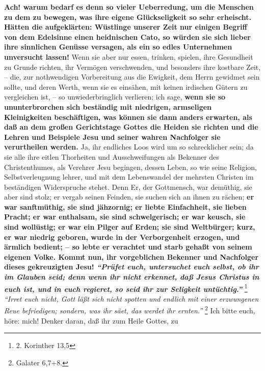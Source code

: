 \medskip

\textbf{Ach! warum bedarf es denn so vieler Ueberredung, um die Menschen zu dem
zu
bewegen, was ihre eigene Glückseligkeit so sehr erheischt. Hätten die
aufgeklärten: Wüstlinge unserer Zeit nur einigen Begriff von dem Edelsinne einen
heidnischen Cato, so würden sie sich lieber ihre
sinnlichen Genüsse
versagen, als ein so edles Unternehmen unversucht lassen!} Wenn sie aber nur
essen, trinken, spielen, ihre Gesundheit zu Grunde richten, ihr Vermögen
verschwenden, und besonders ihre kostbare Zeit, -- die, zur nothwendigen
Vorbereitung aus die Ewigkeit, dem Herrn gewidmet sein sollte, und deren Werth,
wenn sie es einsähen, mit keinen irdischen Gütern zu vergleichen ist, -- so
unwiederbringlich verlieren; ich sage, \textbf{wenn sie so ununterbrorchen sich
beständig mit niedrigen, armseligen Kleinigkeiten beschäftigen, was können sie
dann anders erwarten, als daß an dem großen Gerichtstage Gottes die
Heiden sie
richten und die Lehren und Beispiele Jesu und seiner wahren Nachfolger sie
verurtheilen werden.} Ja, ihr endliches Loos wird um so schrecklicher sein; da
sie alle ihre eitlen Thorheiten und Ausschweifungen als Bekenner des
Christenthumes, als Verehrer Jesu begingen, dessen Leben, so wie seine
Religion, Selbstverleugnung lehrer, und mit dem Lebenswandel der mehrsten
Christen im beständigen Widerspruche stehet. Denn Er, der
Gottmensch, war
demüthig, sie aber sind stolz; er vergab seinen Feinden, sie suchen sich an
ihnen zu rächen; \textbf{er war sanftmüthig, sie sind jähzornig; er liebte
Einfachheit,
sie lieben Pracht; er war enthalsam, sie sind schwelgerisch; er war keusch, sie
sind wollüstig; er war ein Pilger auf Erden; sie sind Weltbürger; kurz, er war
niedrig geboren, wurde in der Verborgenheit erzogen, und ärmlich  bedient; -- so
lebte er verachtet und starb gehaßt von seinem eigenen Volke. Kommt nun, ihr
vorgeblichen Bekenner und Nachfolger dieses gekreuzigten Jesu!
\textit{"`Prüfet euch,
untersuchet euch selbst, ob ihr im Glauben seid; denn wenn ihr nicht erkennet,
daß Jesus Christus in euch ist, und in euch regieret, so seid ihr zur
Seligkeit untüchtig."'}}
\footnote{2. Korinther 13,5}
\textit{"`Irret euch
nicht, Gott läßt sich nicht spotten und endlich mit einer erzwungenen Reue
befriedigen; sondern, was ihr säet, das werdet ihr ernten."'}
\footnote{Galater 6,7+8.}
Ich bitte euch, höre: mich! Denker daran, daß ihr zum Heile Gottes, zu
